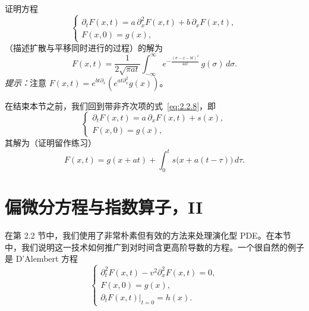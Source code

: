 \begin{exercise}[扩散 $+$ 平移]
证明方程
\begin{equation}
\begin{cases}
\partial_{t}F(x,t)=a\,\partial_{x}^{2}F(x,t)+b\,\partial_{x}F(x,t),\\[1mm]
F(x,0)=g(x),
\end{cases}
\label{eq:2.2.20}
\end{equation}
（描述扩散与平移同时进行的过程）的解为
\begin{equation}
F(x,t)=\frac{1}{2\sqrt{\pi a t}}
\int_{-\infty}^{\infty}
e^{-\frac{(\sigma-x-bt)^{2}}{4 a t}}\,g(\sigma)\,d\sigma.
\label{eq:2.2.21}
\end{equation}
\textit{提示：}注意 $F(x,t)=e^{b t\partial_{x}}\!\left(e^{a t\partial_{x}^{2}}g(x)\right)$。
\end{exercise}

在结束本节之前，我们回到带非齐次项的式~\eqref{eq:2.2.8}，即
\begin{equation}
\begin{cases}
\partial_{t}F(x,t)=a\,\partial_{x}F(x,t)+s(x),\\[1mm]
F(x,0)=g(x),
\end{cases}
\label{eq:2.2.22}
\end{equation}
其解为（证明留作练习）
\begin{equation}
F(x,t)=g(x+a t)+\int_{0}^{t}s\!\bigl(x+a(t-\tau)\bigr)\,d\tau.
\label{eq:2.2.23}
\end{equation}

\section{偏微分方程与指数算子，II}

在第 2.2 节中，我们使用了非常朴素但有效的方法来处理演化型 PDE。在本节中，我们说明这一技术如何推广到对时间含更高阶导数的方程。一个很自然的例子是 D'Alembert 方程
\begin{equation}
\begin{cases}
\partial_{t}^{2}F(x,t)-v^{2}\partial_{x}^{2}F(x,t)=0,\\[1mm]
F(x,0)=g(x),\\
\partial_{t}F(x,t)\big|_{t=0}=h(x).
\end{cases}
\label{eq:2.3.1}
\end{equation}

